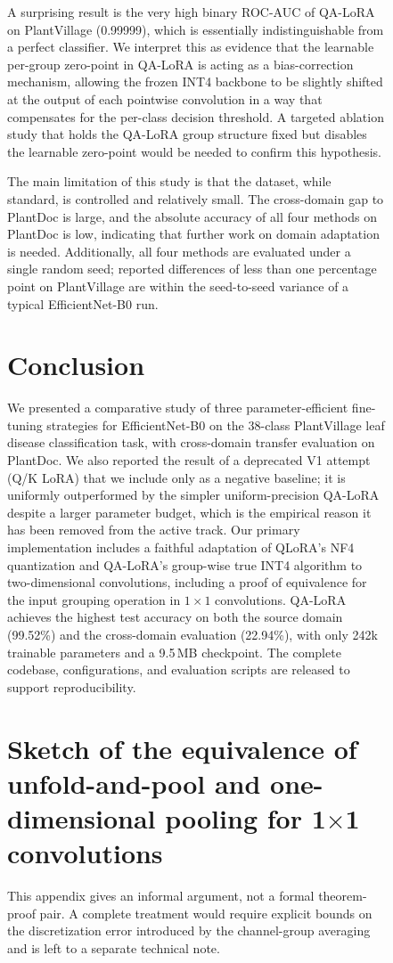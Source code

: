 \documentclass[conference]{IEEEtran}
\begin{document}
\begin{figure}[htbp]
A surprising result is the very high binary ROC-AUC of QA-LoRA on PlantVillage (0.99999), which is essentially indistinguishable from a perfect classifier. We interpret this as evidence that the learnable per-group zero-point in QA-LoRA is acting as a bias-correction mechanism, allowing the frozen INT4 backbone to be slightly shifted at the output of each pointwise convolution in a way that compensates for the per-class decision threshold. A targeted ablation study that holds the QA-LoRA group structure fixed but disables the learnable zero-point would be needed to confirm this hypothesis.

The main limitation of this study is that the dataset, while standard, is controlled and relatively small. The cross-domain gap to PlantDoc is large, and the absolute accuracy of all four methods on PlantDoc is low, indicating that further work on domain adaptation is needed. Additionally, all four methods are evaluated under a single random seed; reported differences of less than one percentage point on PlantVillage are within the seed-to-seed variance of a typical EfficientNet-B0 run.

\section{Conclusion}
We presented a comparative study of three parameter-efficient fine-tuning strategies for EfficientNet-B0 on the 38-class PlantVillage leaf disease classification task, with cross-domain transfer evaluation on PlantDoc. We also reported the result of a deprecated V1 attempt (Q/K LoRA) that we include only as a negative baseline; it is uniformly outperformed by the simpler uniform-precision QA-LoRA despite a larger parameter budget, which is the empirical reason it has been removed from the active track. Our primary implementation includes a faithful adaptation of QLoRA's NF4 quantization and QA-LoRA's group-wise true INT4 algorithm to two-dimensional convolutions, including a proof of equivalence for the input grouping operation in $1\times 1$ convolutions. QA-LoRA achieves the highest test accuracy on both the source domain (99.52\%) and the cross-domain evaluation (22.94\%), with only 242k trainable parameters and a 9.5\,MB checkpoint. The complete codebase, configurations, and evaluation scripts are released to support reproducibility.

\appendix
\section{Sketch of the equivalence of unfold-and-pool and one-dimensional pooling for 1$\times$1 convolutions}\label{app:proof}
This appendix gives an informal argument, not a formal theorem-proof pair. A complete treatment would require explicit bounds on the discretization error introduced by the channel-group averaging and is left to a separate technical note.


\end{figure}
\end{document}
